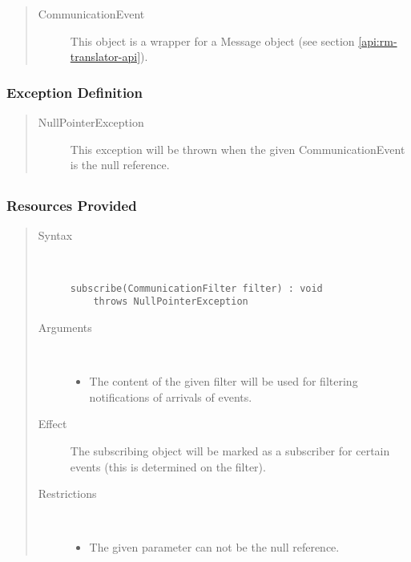 \begin{quote}
	\begin{description}
		\item[CommunicationEvent] This object is a wrapper for a Message object (see
		section \ref{api:rm-translator-api}).
	\end{description} 
\end{quote}

\subsubsection{Exception Definition} 

\begin{quote}
	\begin{description}
		\item[NullPointerException] This exception will be thrown when the given
		CommunicationEvent is the null reference.
	\end{description} 
\end{quote}

\subsection{}

\subsubsection{Resources Provided}

\begin{quote}
	\begin{description}
		\item[Syntax] \
		\begin{verbatim}
subscribe(CommunicationFilter filter) : void
    throws NullPointerException
		\end{verbatim}
		\item[Arguments] \
		\begin{itemize}
		  \item The content of the given filter will be used for filtering
		  notifications of arrivals of events.
		\end{itemize}
		\item[Effect] The subscribing object will be marked as a subscriber for
		certain events (this is determined on the filter).
		\item[Restrictions] \
		\begin{itemize}
		  \item The given parameter can not be the null reference.
		\end{itemize}
	\end{description} 
\end{quote}

